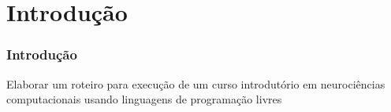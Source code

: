 \section{Introdução} 
\begin{frame}\frametitle{Introdução}
	Elaborar um roteiro para execução de um curso introdutório em neurociências computacionais usando linguagens de programação livres
\end{frame}
